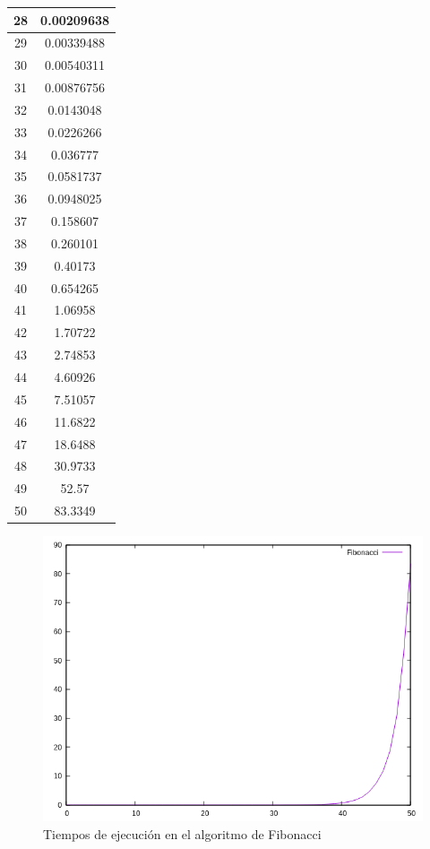 \documentclass{article}
\begin{document}
\begin{longtable}{|c||c|}
	28  &  0.00209638  \\ \hline
	29  &  0.00339488  \\ \hline
	30  &  0.00540311  \\ \hline
	31  &  0.00876756  \\ \hline
	32  &  0.0143048  \\ \hline
	33  &  0.0226266  \\ \hline
	34  &  0.036777  \\ \hline
	35  &  0.0581737  \\ \hline
	36  &  0.0948025  \\ \hline
	37  &  0.158607  \\ \hline
	38  &  0.260101  \\ \hline
	39  &  0.40173  \\ \hline
	40  &  0.654265  \\ \hline
	41  &  1.06958  \\ \hline
	42  &  1.70722  \\ \hline
	43  &  2.74853  \\ \hline
	44  &  4.60926  \\ \hline
	45  &  7.51057  \\ \hline
	46  &  11.6822  \\ \hline
	47  &  18.6488  \\ \hline
	48  &  30.9733  \\ \hline
	49  &  52.57  \\ \hline
	50  &  83.3349  \\ \hline
\end{longtable}

\begin{figure}[H]
	\centering
	\includegraphics[totalheight=8cm]{img/fibonacci}
	\caption{Tiempos de ejecución en el algoritmo de Fibonacci}
	\label{fig:fibonacci}
\end{figure}
\end{document}
